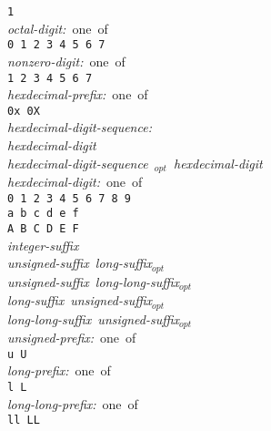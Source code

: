 \mbox{\qquad \qquad \texttt{1}}                                               \\
\noindent \mbox{\qquad \textit{octal-digit:} one of}                          \\
\mbox{\qquad \qquad \texttt{0 1 2 3 4 5 6 7}}                                 \\
\noindent \mbox{\qquad \textit{nonzero-digit:} one of}                        \\
\mbox{\qquad \qquad \texttt{1 2 3 4 5 6 7}}                                   \\
\noindent \mbox{\qquad \textit{hexdecimal-prefix:} one of}                    \\
\mbox{\qquad \qquad \texttt{0x 0X}}                                           \\
\noindent \mbox{\qquad \textit{hexdecimal-digit-sequence:}}                   \\
\mbox{\qquad \qquad \textit{hexdecimal-digit}}                                \\
\mbox{\qquad \qquad \textit{hexdecimal-digit-sequence \qsgl$_{opt}$
                            hexdecimal-digit}}                                \\
\noindent \mbox{\qquad \textit{hexdecimal-digit:} one of}                     \\
\mbox{\qquad \qquad \texttt{0 1 2 3 4 5 6 7 8 9}}                             \\
\mbox{\qquad \qquad \texttt{a b c d e f}}                                     \\
\mbox{\qquad \qquad \texttt{A B C D E F}}                                     \\
\noindent \mbox{\qquad \textit{integer-suffix}}                               \\
\mbox{\qquad \qquad \textit{unsigned-suffix long-suffix$_{opt}$}}             \\
\mbox{\qquad \qquad \textit{unsigned-suffix long-long-suffix$_{opt}$}}        \\
\mbox{\qquad \qquad \textit{long-suffix unsigned-suffix$_{opt}$}}             \\
\mbox{\qquad \qquad \textit{long-long-suffix unsigned-suffix$_{opt}$}}        \\
\noindent \mbox{\qquad \textit{unsigned-prefix:} one of}                      \\
\mbox{\qquad \qquad \texttt{u U}}                                             \\
\noindent \mbox{\qquad \textit{long-prefix:} one of}                          \\
\mbox{\qquad \qquad \texttt{l L}}                                             \\
\noindent \mbox{\qquad \textit{long-long-prefix:} one of}                     \\
\mbox{\qquad \qquad \texttt{ll LL}}                                           \\


